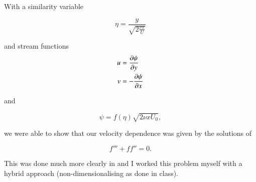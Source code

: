 With a similarity variable 

\begin{equation}\label{eqn:continuumFluidsReview:2530}
\eta = \frac{y}{\sqrt{2 \frac{\nu x}{U}}}
\end{equation}

and stream functions
\begin{align}\label{eqn:continuumFluidsReview:2550}
u &= \frac{\partial {\psi}}{\partial {y}} \\
v &= -\frac{\partial {\psi}}{\partial {x}}
\end{align}

and

\begin{equation}\label{eqn:continuumFluidsReview:2570}
\psi = f(\eta) \sqrt{ 2 \nu x U_0 },
\end{equation}

we were able to show that our velocity dependence was given by the solutions of

\begin{equation}\label{eqn:continuumFluidsReview:2590}
f''' + f f'' = 0.
\end{equation}

This was done much more clearly in \citep{acheson1990elementary} and I worked this problem myself with a hybrid approach (non-dimensionalising as done in class).

